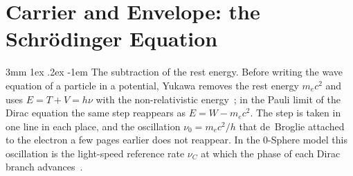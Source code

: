 \documentclass[%
 reprint, amsmath,amssymb, aps, prb, ]{revtex4-2}
\makeatletter
\numberwithin{equation}{section}
\renewcommand\paragraph{%
  \@startsection{paragraph}{4}{\z@}%
    {3mm \@plus 1ex \@minus .2ex}%
    {-1em}%
    {\normalfont\normalsize\itshape}}
\makeatother
\begin{document}
\section{Carrier and Envelope: the Schr\"odinger Equation}
\label{sec:envelope}

\paragraph{The subtraction of the rest energy.} Before writing the wave equation of a particle in a potential, Yukawa removes the rest energy $m_ec^2$ and uses $E = T + V = h\nu$ with the non-relativistic energy~\cite{Yukawa1954}; in the Pauli limit of the Dirac equation the same step reappears as $E = W - m_ec^2$. The step is taken in one line in each place, and the oscillation $\nu_0 = m_ec^2/h$ that de~Broglie attached to the electron a few pages earlier does not reappear. In the 0-Sphere model this oscillation is the light-speed reference rate $\nu_C$ at which the phase of each Dirac branch advances~\cite{H51, H65}.
\end{document}
